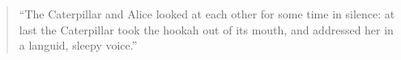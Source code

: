 \documentclass{article}
\begin{document}
    \begin{quote}
        ``The Caterpillar and Alice looked at each other for some time in silence: at
        last the Caterpillar took the hookah out of its mouth, and addressed her in
        a languid, sleepy voice.''~\cite{alice}
    \end{quote}

    \newpage
    \printbibliography
\end{document}
